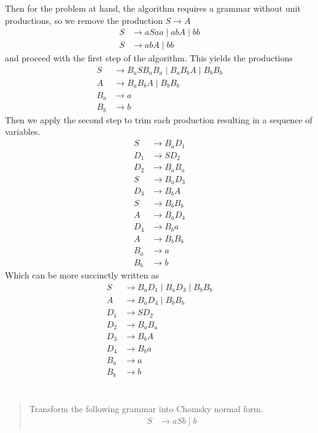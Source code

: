 \documentclass{article}
\begin{document}
Then for the problem at hand, the algorithm requires a grammar without unit productions, so we remove the production $S \to A$
\begin{align*}
    S & \to aSaa \mid abA \mid bb \\
    S & \to abA \mid bb
\end{align*}
and proceed with the first step of the algorithm.
This yields the productions
\begin{align*}
    S   & \to B_a S B_a B_a \mid B_a B_b A \mid B_b B_b \\
    A   & \to B_a B_b A \mid B_b B_b                    \\
    B_a & \to a                                         \\
    B_b & \to b
\end{align*}
Then we apply the second step to trim each production resulting in a sequence of variables.
\begin{align*}
    S   & \to B_a D_1 \\
    D_1 & \to S D_2   \\
    D_2 & \to B_a B_a \\
    S   & \to B_a D_3 \\
    D_3 & \to B_b A   \\
    S   & \to B_b B_b \\
    A   & \to B_a D_4 \\
    D_4 & \to B_b a   \\
    A   & \to B_b B_b \\
    B_a & \to a       \\
    B_b & \to b
\end{align*}
Which can be more succinctly written as
\begin{align*}
    S   & \to B_a D_1 \mid B_a D_3 \mid B_b B_b \\
    A   & \to B_a D_4 \mid B_b B_b              \\
    D_1 & \to S D_2                             \\
    D_2 & \to B_a B_a                           \\
    D_3 & \to B_b A                             \\
    D_4 & \to B_b a                             \\
    B_a & \to a                                 \\
    B_b & \to b
\end{align*}

\section{}
\begin{quote}
    Transform the following grammar into Chomsky normal form.
    \begin{align*}
        S & \to aSb \mid b
    \end{align*}
\end{quote}
\end{document}
